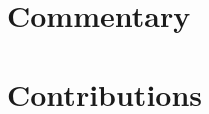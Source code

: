 \documentclass[12pt,twoside,openright,a4paper]{report}
\let\openright=\cleardoublepage
\begin{document}

\tableofcontents



\pagestyle{plain}
\setcounter{page}{1}
\part{Commentary}\label{part:comments}



\part{Contributions}\label{part:contribs}



\openright
\end{document}
